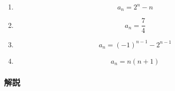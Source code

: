 \begin{enumerate}[label=\textbf{問\arabic*.},leftmargin=3.8em,format=\bookitemlink{practice-basic}{answer}{problem}]
\[                a_n=2+6\left(\frac12\right)^{n-1}
                \]
          \item \[
                  a_n=2^n-n
                \]
          \item \[
                  a_n=\frac74
                \]
          \item \[
                  a_n=(-1)^{n-1}-2^{n-1}
                \]
          \item \[
                  a_n=n(n+1)
                \]
        \end{enumerate}

      \subsubsection{解説}\label{節：標準難易度：解法}\label{節：基本と応用から出題されるもの：解法}
